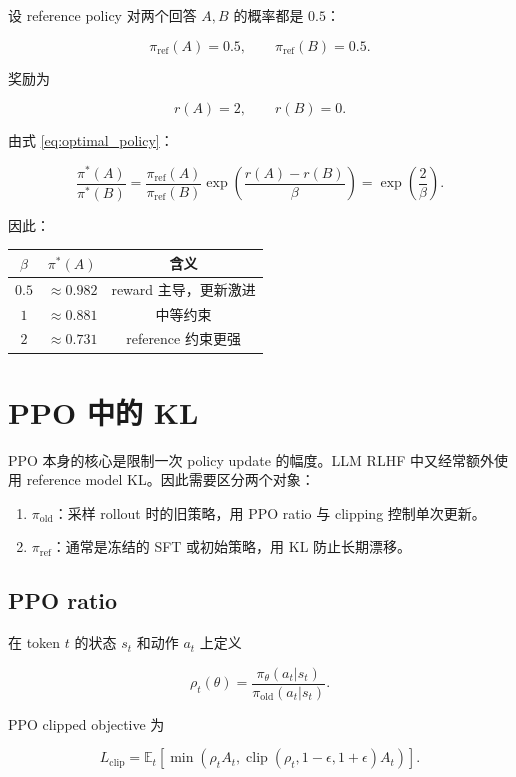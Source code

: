 \documentclass[11pt,a4paper]{ctexart}
\newcommand{\E}{\mathbb{E}}
\newcommand{\piold}{\pi_{\mathrm{old}}}
\newcommand{\piref}{\pi_{\mathrm{ref}}}
\newcommand{\pitheta}{\pi_{\theta}}
\begin{document}
设 reference policy 对两个回答 $A,B$ 的概率都是 $0.5$：

\[
\piref(A)=0.5,
\qquad
\piref(B)=0.5.
\]

奖励为

\[
r(A)=2,
\qquad
r(B)=0.
\]

由式 \eqref{eq:optimal_policy}：

\[
\frac{\pi^*(A)}{\pi^*(B)}
=
\frac{\piref(A)}{\piref(B)}
\exp
\left(
\frac{r(A)-r(B)}{\beta}
\right)
=
\exp\left(\frac{2}{\beta}\right).
\]

因此：

\begin{center}
\begin{tabular}{ccc}
\toprule
$\beta$ & $\pi^*(A)$ & 含义 \\
\midrule
$0.5$ & $\approx 0.982$ & reward 主导，更新激进 \\
$1$ & $\approx 0.881$ & 中等约束 \\
$2$ & $\approx 0.731$ & reference 约束更强 \\
\bottomrule
\end{tabular}
\end{center}

\section{PPO 中的 KL}

PPO 本身的核心是限制一次 policy update 的幅度。LLM RLHF 中又经常额外使用 reference model KL。因此需要区分两个对象：

\begin{enumerate}
    \item $\piold$：采样 rollout 时的旧策略，用 PPO ratio 与 clipping 控制单次更新。
    \item $\piref$：通常是冻结的 SFT 或初始策略，用 KL 防止长期漂移。
\end{enumerate}

\subsection{PPO ratio}

在 token $t$ 的状态 $s_t$ 和动作 $a_t$ 上定义

\begin{equation}
\rho_t(\theta)
=
\frac{
\pitheta(a_t|s_t)
}{
\piold(a_t|s_t)
}.
\end{equation}

PPO clipped objective 为

\begin{equation}
L_{\mathrm{clip}}
=
\E_t
\left[
\min
\left(
\rho_t A_t,
\operatorname{clip}
(\rho_t,1-\epsilon,1+\epsilon)A_t
\right)
\right].
\end{equation}
\end{document}
